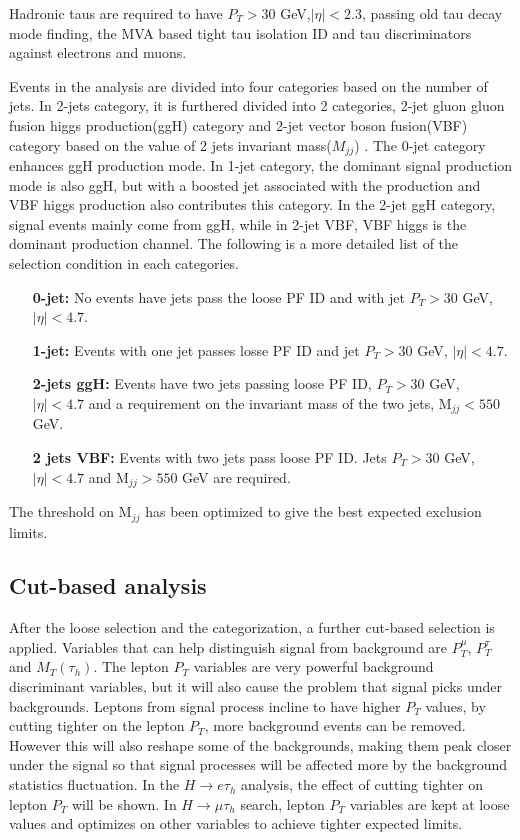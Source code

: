 Hadronic taus are required to have $P_T>30$ GeV,$|\eta|<2.3$, passing old tau decay mode finding, the MVA based tight tau isolation ID and tau discriminators against electrons and muons. %


Events in the analysis are divided into four categories based on the number of jets. In 2-jets category, it is furthered divided into 2 categories,  2-jet gluon gluon fusion higgs production(ggH) category and 2-jet vector boson fusion(VBF) category based on the value of 2 jets invariant mass($M_{jj}$) . The 0-jet category enhances ggH production mode. In 1-jet category, the dominant signal production mode is also ggH, but with a boosted jet associated with the production and VBF higgs production also contributes this category. In the 2-jet ggH category, signal events mainly come from ggH, while in 2-jet VBF, VBF higgs is the dominant production channel.  The following is a more detailed list of the selection condition in each categories.

\begin{enumerate}
\item[{\bf 0-jet:}] No events have jets pass the loose PF ID and  with jet $P_T>30$ GeV, $|\eta|<4.7$.
\item[{\bf 1-jet:}] Events with one jet passes losse PF ID and jet $P_T>30$ GeV, $|\eta|<4.7$.
\item [{\bf 2-jets ggH:}] Events have two jets passing loose PF ID, $P_T>30$ GeV, $|\eta|<4.7$ and a requirement on the invariant mass of the two jets, $\textrm{M}_{jj}<550$ GeV. 
\item [{\bf 2 jets VBF:}] Events with two jets pass loose PF ID. Jets $P_T>30$ GeV, $|\eta|<4.7$ and $\textrm{M}_{jj}>550$ GeV are required. 
\end{enumerate} The threshold on $\textrm{M}_{jj}$ has been optimized to give the best expected exclusion limits.


\subsection{Cut-based analysis}
After the loose selection and the categorization, a further cut-based selection is applied. Variables that can help distinguish signal from background are $P_{T}^{\mu}$, $P_{T}^{\tau}$ and $M_{T}(\tau_{h})$. The lepton $P_{T}$ variables are very powerful background discriminant variables, but it will also cause the problem that signal picks under backgrounds. Leptons from signal process  incline to have higher $P_{T}$ values, by cutting tighter on the lepton $P_{T}$, more background events can be removed. However this will also reshape some of the backgrounds, making them peak closer under the signal so that signal processes will be affected more by the background statistics fluctuation. In the $H\rightarrow e\tau_h$ analysis, the effect of cutting tighter on lepton $P_{T}$ will be shown. In $H\rightarrow\mu\tau_h$ search, lepton $P_{T}$ variables are kept at loose values and optimizes on other variables to achieve tighter expected limits. 

